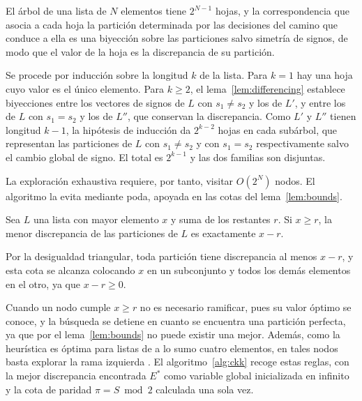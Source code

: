\begin{theorem}\label{thm:ckk-tree}
El árbol de una lista de $N$ elementos tiene $2^{N-1}$ hojas, y la correspondencia que asocia a cada hoja la partición determinada por las decisiones del camino que conduce a ella es una biyección sobre las particiones salvo simetría de signos, de modo que el valor de la hoja es la discrepancia de su partición.
\end{theorem}

\begin{demostracion}
Se procede por inducción sobre la longitud $k$ de la lista. Para $k = 1$ hay una hoja cuyo valor es el único elemento. Para $k \geq 2$, el lema~\ref{lem:differencing} establece biyecciones entre los vectores de signos de $L$ con $s_1 \neq s_2$ y los de $L'$, y entre los de $L$ con $s_1 = s_2$ y los de $L''$, que conservan la discrepancia. Como $L'$ y $L''$ tienen longitud $k - 1$, la hipótesis de inducción da $2^{k-2}$ hojas en cada subárbol, que representan las particiones de $L$ con $s_1 \neq s_2$ y con $s_1 = s_2$ respectivamente salvo el cambio global de signo. El total es $2^{k-1}$ y las dos familias son disjuntas.
\end{demostracion}

La exploración exhaustiva requiere, por tanto, visitar $O(2^N)$ nodos. El algoritmo la evita mediante poda, apoyada en las cotas del lema~\ref{lem:bounds}.

\begin{lemma}\label{lem:prune}
Sea $L$ una lista con mayor elemento $x$ y suma de los restantes $r$. Si $x \geq r$, la menor discrepancia de las particiones de $L$ es exactamente $x - r$.
\end{lemma}

\begin{demostracion}
Por la desigualdad triangular, toda partición tiene discrepancia al menos $x - r$, y esta cota se alcanza colocando $x$ en un subconjunto y todos los demás elementos en el otro, ya que $x - r \geq 0$.
\end{demostracion}

Cuando un nodo cumple $x \geq r$ no es necesario ramificar, pues su valor óptimo se conoce, y la búsqueda se detiene en cuanto se encuentra una partición perfecta, ya que por el lema~\ref{lem:bounds} no puede existir una mejor. Además, como la heurística es óptima para listas de a lo sumo cuatro elementos, en tales nodos basta explorar la rama izquierda \parencite{mertens2006}. El algoritmo~\ref{alg:ckk} recoge estas reglas, con la mejor discrepancia encontrada $E^\ast$ como variable global inicializada en infinito y la cota de paridad $\pi = S \bmod 2$ calculada una sola vez.

